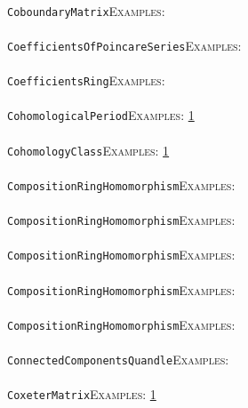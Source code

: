 \documentclass[a4paper,11pt]{report}
\begin{document}
{{ \\
 \texttt{CoboundaryMatrix}{\nobreakspace}{\nobreakspace}{\nobreakspace}{\nobreakspace}\textsc{Examples:} \\
 \\
 \texttt{CoefficientsOfPoincareSeries}{\nobreakspace}{\nobreakspace}{\nobreakspace}{\nobreakspace}\textsc{Examples:} \\
 \\
 \texttt{CoefficientsRing}{\nobreakspace}{\nobreakspace}{\nobreakspace}{\nobreakspace}\textsc{Examples:} \\
 \\
 \texttt{CohomologicalPeriod}{\nobreakspace}{\nobreakspace}{\nobreakspace}{\nobreakspace}\textsc{Examples:} \href{tutorial/chap10.html} {1}{\nobreakspace} \\
 \\
 \texttt{CohomologyClass}{\nobreakspace}{\nobreakspace}{\nobreakspace}{\nobreakspace}\textsc{Examples:} \href{../www/SideLinks/About/aboutGouter.html} {1}{\nobreakspace} \\
 \\
 \texttt{CompositionRingHomomorphism}{\nobreakspace}{\nobreakspace}{\nobreakspace}{\nobreakspace}\textsc{Examples:} \\
 \\
 \texttt{CompositionRingHomomorphism}{\nobreakspace}{\nobreakspace}{\nobreakspace}{\nobreakspace}\textsc{Examples:} \\
 \\
 \texttt{CompositionRingHomomorphism}{\nobreakspace}{\nobreakspace}{\nobreakspace}{\nobreakspace}\textsc{Examples:} \\
 \\
 \texttt{CompositionRingHomomorphism}{\nobreakspace}{\nobreakspace}{\nobreakspace}{\nobreakspace}\textsc{Examples:} \\
 \\
 \texttt{CompositionRingHomomorphism}{\nobreakspace}{\nobreakspace}{\nobreakspace}{\nobreakspace}\textsc{Examples:} \\
 \\
 \texttt{ConnectedComponentsQuandle}{\nobreakspace}{\nobreakspace}{\nobreakspace}{\nobreakspace}\textsc{Examples:} \\
 \\
 \texttt{CoxeterMatrix}{\nobreakspace}{\nobreakspace}{\nobreakspace}{\nobreakspace}\textsc{Examples:} \href{../www/SideLinks/About/aboutDavisComplex.html} {1}{\nobreakspace} \\
 \\
}}
\end{document}
